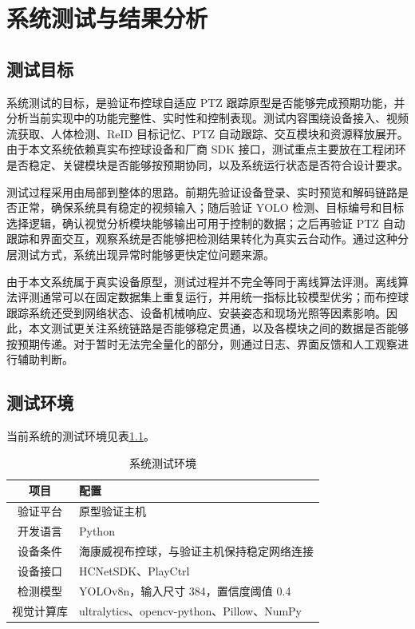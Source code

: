 \chapter{系统测试与结果分析}

\section{测试目标}

系统测试的目标，是验证布控球自适应 PTZ 跟踪原型是否能够完成预期功能，并分析当前实现中的功能完整性、实时性和控制表现。测试内容围绕设备接入、视频流获取、人体检测、ReID 目标记忆、PTZ 自动跟踪、交互模块和资源释放展开。由于本文系统依赖真实布控球设备和厂商 SDK 接口，测试重点主要放在工程闭环是否稳定、关键模块是否能够按预期协同，以及系统运行状态是否符合设计要求。

测试过程采用由局部到整体的思路。前期先验证设备登录、实时预览和解码链路是否正常，确保系统具有稳定的视频输入；随后验证 YOLO 检测、目标编号和目标选择逻辑，确认视觉分析模块能够输出可用于控制的数据；之后再验证 PTZ 自动跟踪和界面交互，观察系统是否能够把检测结果转化为真实云台动作。通过这种分层测试方式，系统出现异常时能够更快定位问题来源。

由于本文系统属于真实设备原型，测试过程并不完全等同于离线算法评测。离线算法评测通常可以在固定数据集上重复运行，并用统一指标比较模型优劣；而布控球跟踪系统还受到网络状态、设备机械响应、安装姿态和现场光照等因素影响。因此，本文测试更关注系统链路是否能够稳定贯通，以及各模块之间的数据是否能够按预期传递。对于暂时无法完全量化的部分，则通过日志、界面反馈和人工观察进行辅助判断。

\section{测试环境}

当前系统的测试环境见表\ref{tab:test-env}。

\begin{table}[H]
    \centering
    \caption{系统测试环境}
    \label{tab:test-env}
    \begin{tabularx}{\textwidth}{c|X}
        \hline
        项目 & 配置 \\
        \hline
        验证平台 & 原型验证主机 \\
        \hline
        开发语言 & Python \\
        \hline
        设备条件 & 海康威视布控球，与验证主机保持稳定网络连接 \\
        \hline
        设备接口 & HCNetSDK、PlayCtrl \\
        \hline
        检测模型 & YOLOv8n，输入尺寸 384，置信度阈值 0.4 \\
        \hline
        视觉计算库 & ultralytics、opencv-python、Pillow、NumPy \\
        \hline
    \end{tabularx}
\end{table}

